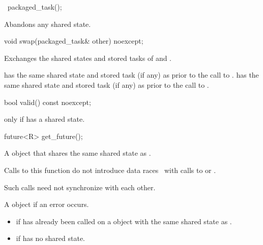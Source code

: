 %
\begin{itemdecl}
~packaged_task();
\end{itemdecl}

\begin{itemdescr}
\pnum
\effects
Abandons any shared state.
\end{itemdescr}

%
\begin{itemdecl}
void swap(packaged_task& other) noexcept;
\end{itemdecl}

\begin{itemdescr}
\pnum
\effects Exchanges the shared states and stored tasks of  and .

\pnum
\ensures {} has the same shared state
and stored task (if any) as 
prior to the call to .  has the same shared state
and stored task (if any)
as  prior to the call to .
\end{itemdescr}

%
\begin{itemdecl}
bool valid() const noexcept;
\end{itemdecl}

\begin{itemdescr}
\pnum
\returns {} only if  has a shared state.
\end{itemdescr}

%
\begin{itemdecl}
future<R> get_future();
\end{itemdecl}

\begin{itemdescr}
\pnum
\returns A  object that shares the same shared state as .

\pnum
\sync Calls to this function do not introduce
data races~ with calls to
 or
.
\begin{note}
Such calls need not synchronize with each other.
\end{note}

\pnum
\throws A  object if an error occurs.

\pnum
\errors
\begin{itemize}
\item {} if  has already been called on
a  object with the same shared state as .
\item {} if  has no shared state.
\end{itemize}
\end{itemdescr}

